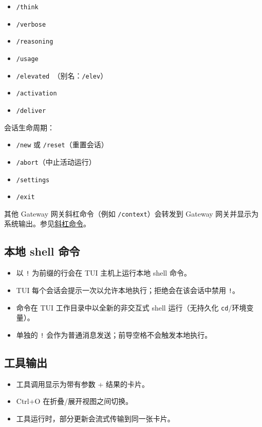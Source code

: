 \begin{itemize}
  \item \texttt{/think }
  \item \texttt{/verbose }
  \item \texttt{/reasoning }
  \item \texttt{/usage }
  \item \texttt{/elevated }（别名：\texttt{/elev}）
  \item \texttt{/activation }
  \item \texttt{/deliver }
\end{itemize}


会话生命周期：

\begin{itemize}
  \item \texttt{/new} 或 \texttt{/reset}（重置会话）
  \item \texttt{/abort}（中止活动运行）
  \item \texttt{/settings}
  \item \texttt{/exit}
\end{itemize}


其他 Gateway 网关斜杠命令（例如 \texttt{/context}）会转发到 Gateway 网关并显示为系统输出。参见\href{/tools/slash-commands}{斜杠命令}。

\subsection{本地 shell 命令}


\begin{itemize}
  \item 以 \texttt{!} 为前缀的行会在 TUI 主机上运行本地 shell 命令。
  \item TUI 每个会话会提示一次以允许本地执行；拒绝会在该会话中禁用 \texttt{!}。
  \item 命令在 TUI 工作目录中以全新的非交互式 shell 运行（无持久化 \texttt{cd}/环境变量）。
  \item 单独的 \texttt{!} 会作为普通消息发送；前导空格不会触发本地执行。
\end{itemize}


\subsection{工具输出}


\begin{itemize}
  \item 工具调用显示为带有参数 + 结果的卡片。
  \item Ctrl+O 在折叠/展开视图之间切换。
  \item 工具运行时，部分更新会流式传输到同一张卡片。
\end{itemize}


